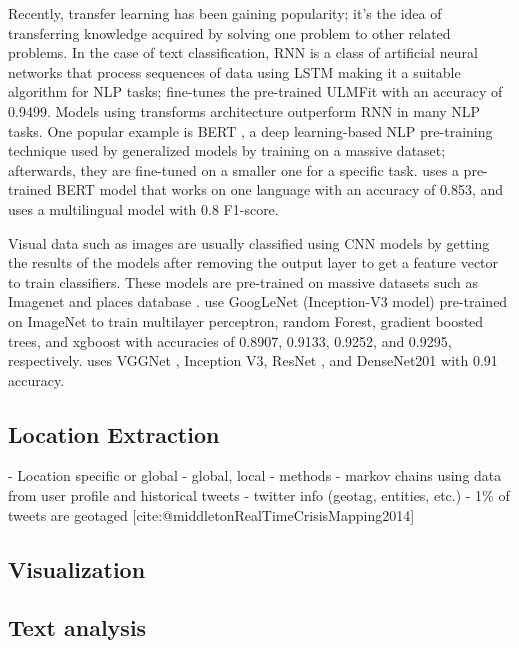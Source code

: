 Recently, transfer learning has been gaining popularity; it's the idea of transferring knowledge
acquired by solving one problem to other related problems. In the case of text classification,
\ac{RNN} is a class of artificial neural networks that process sequences of data using \ac{LSTM}
making it a suitable algorithm for \ac{NLP} tasks;
 fine-tunes the pre-trained \ac{ULMFit}
\cite{howardUniversalLanguageModel2018} with an accuracy of 0.9499. Models using transforms
architecture outperform \ac{RNN} in many \ac{NLP} tasks. One popular example is \ac{BERT}
\cite{devlinBERTPretrainingDeep2019}, a deep learning-based \ac{NLP} pre-training technique used by
generalized models by training on a massive dataset; afterwards, they are fine-tuned on a smaller
one for a specific task.  uses a pre-trained \ac{BERT} model
that works on one language with an accuracy of 0.853, and
 uses a multilingual model with 0.8 F1-score.

Visual data such as images are usually classified using \ac{CNN} models by getting the results of
the models after removing the output layer to get a feature vector to train classifiers. These
models are pre-trained on massive datasets such as Imagenet
\cite{krizhevskyImageNetClassificationDeep2017} and places database
\cite{zhouLearningDeepFeatures2014}.  use GoogLeNet
(Inception-V3 model) \cite{7780677} pre-trained on ImageNet to train multilayer perceptron, random
Forest, gradient boosted trees, and  xgboost with accuracies of 0.8907, 0.9133, 0.9252, and 0.9295,
respectively.  uses VGGNet
\cite{simonyanVeryDeepConvolutional2015}, Inception V3, ResNet \cite{heDeepResidualLearning2015},
and DenseNet201 \cite{huangDenselyConnectedConvolutional2018} with 0.91 accuracy.

\subsection{Location Extraction}
- Location specific or global
  - global, local
  - methods
    - markov chains using data from user profile and historical tweets
  - twitter info (geotag, entities, etc.)
  - 1\% of tweets are geotaged    [cite:@middletonRealTimeCrisisMapping2014]
\subsection{Visualization}

\subsection{Text analysis}
